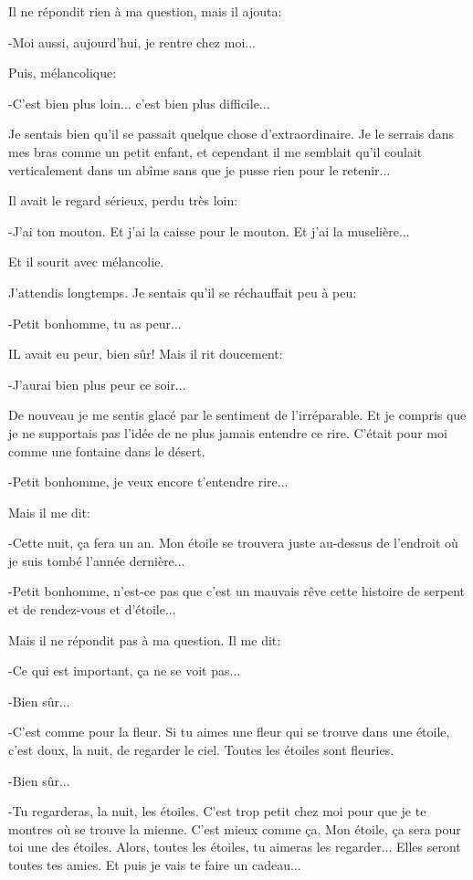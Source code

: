\documentclass{report}
\begin{document}
\begin{paracol}{2}
Il ne répondit rien à ma question, mais il ajouta:

-Moi aussi, aujourd'hui, je rentre chez moi...

Puis, mélancolique:

-C'est bien plus loin... c'est bien plus difficile...

Je sentais bien qu'il se passait quelque chose d'extraordinaire. Je le serrais dans mes bras comme un petit enfant, et cependant il me semblait qu'il coulait verticalement dans un abîme sans que je pusse rien pour le retenir...

Il avait le regard sérieux, perdu très loin:

-J'ai ton mouton. Et j'ai la caisse pour le mouton. Et j'ai la muselière...

Et il sourit avec mélancolie.

J'attendis longtemps. Je sentais qu'il se réchauffait peu à peu:

-Petit bonhomme, tu as peur...

IL avait eu peur, bien sûr! Mais il rit doucement:

-J'aurai bien plus peur ce soir...

De nouveau je me sentis glacé par le sentiment de l'irréparable. Et je compris que je ne supportais pas l'idée de ne plus jamais entendre ce rire. C'était pour moi comme une fontaine dans le désert.

-Petit bonhomme, je veux encore t'entendre rire...

Mais il me dit:

-Cette nuit, ça fera un an. Mon étoile se trouvera juste au-dessus de l'endroit où je suis tombé l'année dernière...

-Petit bonhomme, n'est-ce pas que c'est un mauvais rêve cette histoire de serpent et de rendez-vous et d'étoile...

Mais il ne répondit pas à ma question. Il me dit:

-Ce qui est important, ça ne se voit pas...

-Bien sûr...

-C'est comme pour la fleur. Si tu aimes une fleur qui se trouve dans une étoile, c'est doux, la nuit, de regarder le ciel. Toutes les étoiles sont fleuries.

-Bien sûr...

-Tu regarderas, la nuit, les étoiles. C'est trop petit chez moi pour que je te montres où se trouve la mienne. C'est mieux comme ça. Mon étoile, ça sera pour toi une des étoiles. Alors, toutes les étoiles, tu aimeras les regarder... Elles seront toutes tes amies. Et puis je vais te faire un cadeau...


\end{paracol}
\end{document}
